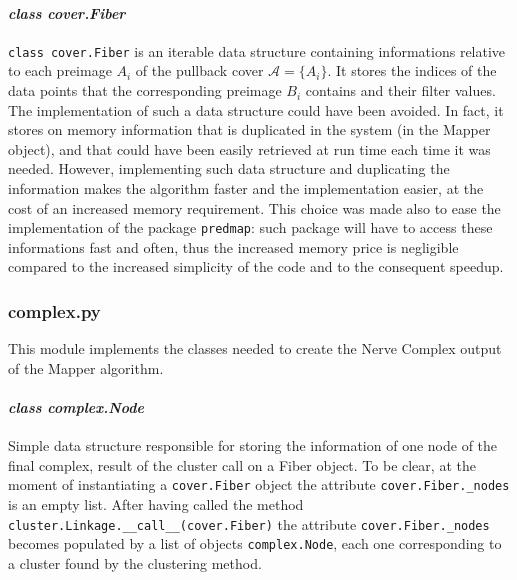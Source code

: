 \paragraph{\textit{class cover.Fiber}}
\lstinline|class cover.Fiber| is an iterable data structure containing informations relative to each preimage $A_i$ of the pullback cover $\mathcal A = \{A_i\}$. It stores the indices of the data points that the corresponding preimage $B_i$ contains and their filter values. The implementation of such a data structure could have been avoided. In fact, it stores on memory information that is duplicated in the system (in the Mapper object), and that could have been easily retrieved at run time each time it was needed. However, implementing such data structure and duplicating the information makes the algorithm faster and the implementation easier, at the cost of an increased memory requirement. This choice was made also to ease the implementation of the package \lstinline|predmap|: such package will have to access these informations fast and often, thus the increased memory price is negligible compared to the increased simplicity of the code and to the consequent speedup.

\subsubsection{complex.py}
This module implements the classes needed to create the Nerve Complex output of the Mapper algorithm.
\paragraph{\textit{class complex.Node}}
Simple data structure responsible for storing the information of one node of the final complex, result of the cluster call on a Fiber object. To be clear, at the moment of instantiating a \lstinline|cover.Fiber| object the attribute \lstinline|cover.Fiber._nodes| is an empty list. After having called the method \lstinline|cluster.Linkage.__call__(cover.Fiber)| the attribute  \lstinline|cover.Fiber._nodes| becomes populated by a list of objects \lstinline|complex.Node|, each one corresponding to a cluster found by the clustering method.
